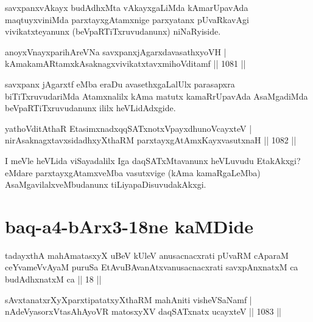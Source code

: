 \begin{artha}
savxpanxvAkayx budAdhxMta vAkayxgaLiMda kAmarUpavAda maqtuyxviniMda parxtayxgAtamxnige parxyatanx pUvaRkavAgi vivikatxteyanunx (beVpaRTiTxruvudanunx) niNaRyiside.
\end{artha}


\begin{shl}
anoyxVnayxparihAreVNa savxpanxjAgarxdavasathxyoVH | \\
kAmakamARtamxkAsaknagxvivikatxtavxmihoVditamf \hfill||  1081 ||  
\end{shl}

\begin{artha}
savxpanx jAgarxtf eMba eraDu avasethxgaLalUlx parasapxra biTiTxruvudariMda Atamxnalilx kAma matutx kamaRrUpavAda AsaMgadiMda beVpaRTiTxruvudanunx ililx heVLidAdxgide.
\end{artha}

\begin{shl}
yathoVditAthaR EtasimxnadxqqSATxnotxV\s payxdhunoVcayxteV | \\
nirAsaknagxtavxsidadhxyXthaRM parxtayxgAtAmxKayxvasutxnaH \hfill ||  1082 ||  
\end{shl}

\begin{artha}
I meVle heVLida viSayadalilx Iga daqSATxMtavanunx heVLuvudu EtakAkxgi? eMdare parxtayxgAtamxveMba vasutxvige (kAma kamaRgaLeMba) AsaMgavilalxveMbudanunx tiLiyapaDisuvudakAkxgi.
\end{artha}

\section*{baq-a4-bArx3-18ne kaMDide}

\begin{shl}
tadayxthA mahAmatasxyX uBeV kUleV anusacnacxrati pUvaRM cAparaM ceYvameVvAyaM puruSa EtAvuBAvanAtxvanusacnacxrati savxpAnxnatxM ca budAdhxnatxM ca || 18 ||
\end{shl}



\begin{shl}
sAvxtanatxrXyXparxtipatatxyXthaRM mahAniti visheVSaNamf | \\
nAdeVyasorxVtasA\s hAyoVR matosxyXV daqSATxnatx ucayxteV \hfill||  1083 ||  
\end{shl}
				
